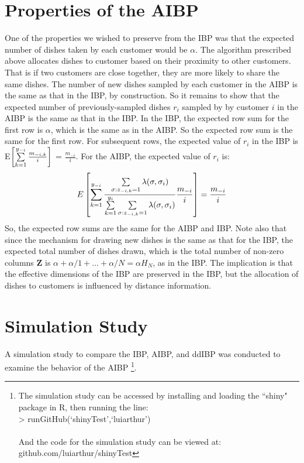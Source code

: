 \section{Properties of the AIBP}
One of the properties we wished to preserve from the IBP was that the expected
number of dishes taken by each customer would be $\alpha$. The algorithm
prescribed above allocates dishes to customer based on their proximity to other
customers.  That is if two customers are close together, they are more likely
to share the same dishes. The number of new dishes sampled by each customer in
the AIBP is the same as that in the IBP, by construction. So it remains to show
that the expected number of previously-sampled dishes $r_i$ sampled by by
customer $i$ in the AIBP is the same as that in the IBP. In the IBP, the
expected row sum for the first row is $\alpha$, which is the same as in the
AIBP. So the expected row sum is the same for the first row. For subsequent
rows, the expected value of $r_i$ in the IBP is E$\left[\sum\limits_{k=1}^{y_{-i}}
\frac{m_{-i,k}}{i}\right]$ = $\frac{m_{-i}}{i}$.  For the AIBP,
the expected value of $r_i$ is:
\[
  E\left[\sum\limits_{k=1}^{y_{-i}}\displaystyle\frac{\sum\limits_{\sigma:z_{-i,k}=1}^{}\lambda(\sigma,\sigma_i)} {\sum\limits_{k=1}^{y_i}\sum\limits_{\sigma:z_{-i,k}=1}^{}\lambda(\sigma,\sigma_i)} \frac{m_{-i}}{i}\right] = \frac{m_{-i}}{i}
\]
So, the expected row sums are the same for the AIBP and IBP. Note also that
since the mechanism for drawing new dishes is the same as that for the IBP, the
expected total number of dishes drawn, which is the total number of non-zero
columns $\bm Z$ is $\alpha+\alpha/1+...+\alpha/N = \alpha H_N$, as in the IBP. 
The implication is that the effective dimensions of the IBP are preserved in the
IBP, but the allocation of dishes to customers is influenced by distance 
information.\\

\section{Simulation Study}
A simulation study to compare the IBP, AIBP, and ddIBP was conducted to examine the
behavior of the AIBP \footnote{The simulation study can be accessed by installing 
and loading the ``shiny" package in R, then running the line: \\
> runGitHub(`shinyTest',`luiarthur')\\\\
And the code for the simulation study can be viewed at: \\
github.com/luiarthur/shinyTest}. 

